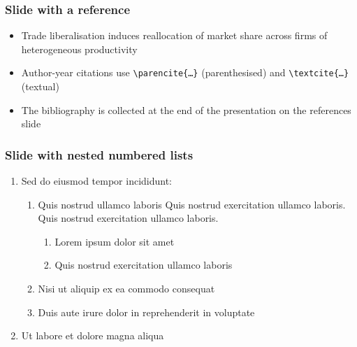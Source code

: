 \expandafter\documentclass\expandafter[\presentationclassoptions]{beamer}
\begin{document}
\begin{frame}
  \frametitle{Slide with a reference}
  \begin{itemize}
    \item Trade liberalisation induces reallocation of market share across firms of heterogeneous productivity \parencite{melitz_impact_2003}
    \item Author-year citations use \texttt{\textbackslash parencite\{\dots\}} (parenthesised) and \texttt{\textbackslash textcite\{\dots\}} (textual)
    \item The bibliography is collected at the end of the presentation on the references slide
  \end{itemize}
\end{frame}

\begin{frame}
  \frametitle{Slide with nested numbered lists}
  \begin{enumerate}
    \item Sed do eiusmod tempor incididunt:
      \begin{enumerate}
        \item Quis nostrud ullamco laboris Quis nostrud exercitation ullamco laboris. Quis nostrud exercitation ullamco laboris.
          \begin{enumerate}
            \item Lorem ipsum dolor sit amet
            \item Quis nostrud exercitation ullamco laboris
          \end{enumerate}
        \item Nisi ut aliquip ex ea commodo consequat
        \item Duis aute irure dolor in reprehenderit in voluptate
      \end{enumerate}
    \item Ut labore et dolore magna aliqua
  \end{enumerate}
\end{frame}
\end{document}
